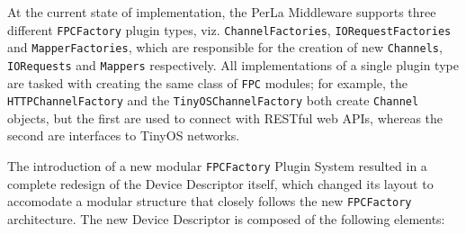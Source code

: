 At the current state of implementation, the PerLa Middleware supports three
different \texttt{FPCFactory} plugin types, viz. \texttt{ChannelFactories},
\texttt{IORequestFactories} and \texttt{MapperFactories}, which are responsible
for the creation of new \texttt{Channels}, \texttt{IORequests} and
\texttt{Mappers} respectively. All implementations of a single plugin type are
tasked with creating the same class of \texttt{FPC} modules; for example, the
\texttt{HTTPChannelFactory} and the \texttt{TinyOSChannelFactory} both create
\texttt{Channel} objects, but the first are used to connect with RESTful web
APIs, whereas the second are interfaces to TinyOS networks.

The introduction of a new modular \texttt{FPCFactory} Plugin System resulted in
a complete redesign of the Device Descriptor itself, which changed its layout
to accomodate a modular structure that closely follows the new
\texttt{FPCFactory} architecture. The new Device Descriptor is composed of the
following elements:

